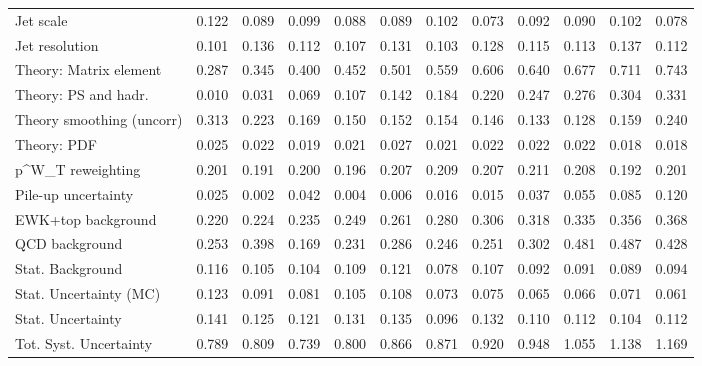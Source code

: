 \begin{tabular}{l|p{0.6cm}p{0.6cm}p{0.6cm}p{0.6cm}p{0.6cm}p{0.6cm}p{0.6cm}p{0.6cm}p{0.6cm}p{0.6cm}p{0.6cm}}
Jet scale                                & 0.122 & 0.089 & 0.099 & 0.088 & 0.089 & 0.102 & 0.073 & 0.092 & 0.090 & 0.102 & 0.078 \\
Jet resolution                           & 0.101 & 0.136 & 0.112 & 0.107 & 0.131 & 0.103 & 0.128 & 0.115 & 0.113 & 0.137 & 0.112 \\
Theory: Matrix element                   & 0.287 & 0.345 & 0.400 & 0.452 & 0.501 & 0.559 & 0.606 & 0.640 & 0.677 & 0.711 & 0.743 \\
Theory: PS and hadr.                     & 0.010 & 0.031 & 0.069 & 0.107 & 0.142 & 0.184 & 0.220 & 0.247 & 0.276 & 0.304 & 0.331 \\
Theory smoothing (uncorr)                & 0.313 & 0.223 & 0.169 & 0.150 & 0.152 & 0.154 & 0.146 & 0.133 & 0.128 & 0.159 & 0.240 \\
Theory: PDF                              & 0.025 & 0.022 & 0.019 & 0.021 & 0.027 & 0.021 & 0.022 & 0.022 & 0.022 & 0.018 & 0.018 \\
p^{W}_{T} reweighting                    & 0.201 & 0.191 & 0.200 & 0.196 & 0.207 & 0.209 & 0.207 & 0.211 & 0.208 & 0.192 & 0.201 \\
Pile-up uncertainty                      & 0.025 & 0.002 & 0.042 & 0.004 & 0.006 & 0.016 & 0.015 & 0.037 & 0.055 & 0.085 & 0.120 \\
EWK+top background                       & 0.220 & 0.224 & 0.235 & 0.249 & 0.261 & 0.280 & 0.306 & 0.318 & 0.335 & 0.356 & 0.368 \\
QCD background                           & 0.253 & 0.398 & 0.169 & 0.231 & 0.286 & 0.246 & 0.251 & 0.302 & 0.481 & 0.487 & 0.428 \\
Stat. Background                         & 0.116 & 0.105 & 0.104 & 0.109 & 0.121 & 0.078 & 0.107 & 0.092 & 0.091 & 0.089 & 0.094 \\
Stat. Uncertainty (MC)                   & 0.123 & 0.091 & 0.081 & 0.105 & 0.108 & 0.073 & 0.075 & 0.065 & 0.066 & 0.071 & 0.061 \\
\hline
Stat. Uncertainty                        & 0.141 & 0.125 & 0.121 & 0.131 & 0.135 & 0.096 & 0.132 & 0.110 & 0.112 & 0.104 & 0.112 \\
\hline
Tot. Syst. Uncertainty                   & 0.789 & 0.809 & 0.739 & 0.800 & 0.866 & 0.871 & 0.920 & 0.948 & 1.055 & 1.138 & 1.169 \\
\hline
\end{tabular}
